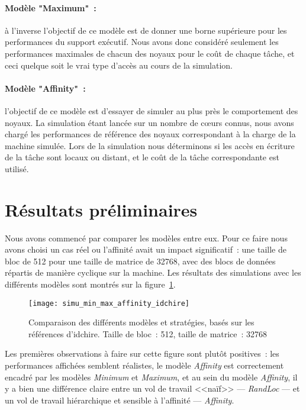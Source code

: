 \paragraph{Modèle "Maximum"~:} à l'inverse l'objectif de ce modèle est de donner une borne supérieure pour les performances du support exécutif.
Nous avons donc considéré seulement les performances maximales de chacun des noyaux pour le coût de chaque tâche, et ceci quelque soit le vrai type d'accès au cours de la simulation.

\paragraph{Modèle "Affinity"~:} l'objectif de ce modèle est d'essayer de simuler au plus près le comportement des noyaux.
La simulation étant lancée sur un nombre de cœurs connus, nous avons chargé les performances de référence des noyaux correspondant à la charge de la machine simulée.
Lors de la simulation nous déterminons si les accès en écriture de la tâche sont locaux ou distant, et le coût de la tâche correspondante est utilisé.




\section{Résultats préliminaires}\label{sec:simulation:resultats}


Nous avons commencé par comparer les modèles entre eux.
Pour ce faire nous avons choisi un cas réel ou l'affinité avait un impact significatif~: une taille de bloc de 512 pour une taille de matrice de 32768, avec des blocs de données répartis de manière cyclique sur la machine.
Les résultats des simulations avec les différents modèles sont montrés sur la figure~\ref{fig:simu:modeles:idchire}.

\begin{figure}[h!]
  \centering
  \texttt{[image: simu\_min\_max\_affinity\_idchire]}
  \caption{Comparaison des différents modèles et stratégies, basés sur les références d'idchire. Taille de bloc~: 512, taille de matrice~: 32768}\label{fig:simu:modeles:idchire}
\end{figure}


Les premières observations à faire sur cette figure sont plutôt positives~: les performances affichées semblent réalistes, le modèle \emph{Affinity} est correctement encadré par les modèles \emph{Minimum} et \emph{Maximum}, et au sein du modèle \emph{Affinity}, il y a bien une différence claire entre un vol de travail <<naïf>> --- \emph{RandLoc} --- et un vol de travail hiérarchique et sensible à l'affinité --- \emph{Affinity}.

